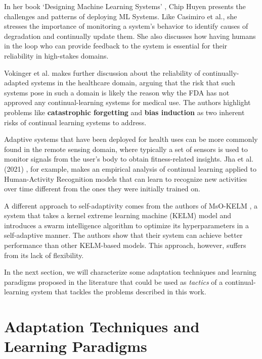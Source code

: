 \documentclass[../main.tex]{subfiles}
\begin{document}
    In her book `Designing Machine Learning Systems' \cite{huyen_designing_2022}, Chip Huyen presents the challenges and patterns of deploying ML Systems. Like Casimiro et al., she stresses the importance of monitoring a system's behavior to identify causes of degradation and continually update them. She also discusses how having humans in the loop who can provide feedback to the system is essential for their reliability in high-stakes domains.

    Vokinger et al. \cite{vokingerContinualLearningMedical2021} makes further discussion about the reliability of continually-adapted systems in the healthcare domain, arguing that the risk that such systems pose in such a domain is likely the reason why the FDA has not approved any continual-learning systems for medical use. The authors highlight problems like \textbf{catastrophic forgetting} and \textbf{bias induction} as two inherent risks of continual learning systems to address.

    Adaptive systems that have been deployed for health uses can be more commonly found in the remote sensing domain, where typically a set of sensors is used to monitor signals from the user's body to obtain fitness-related insights. Jha et al. (2021) \cite{jhaContinualLearningSensorbased2021}, for example, makes an empirical analysis of continual learning applied to Human-Activity Recognition models that can learn to recognize new activities over time different from the ones they were initially trained on.
    
    A different approach to self-adaptivity comes from the authors of MsO-KELM \cite{haoTechnologyOrientedPathwayAuxiliary2022}, a system that takes a kernel extreme learning machine (KELM) model \cite{xiaEvolvingKernelExtreme2022} and introduces a swarm intelligence algorithm to optimize its hyperparameters in a self-adaptive manner. The authors show that their system can achieve better performance than other KELM-based models. This approach, however, suffers from its lack of flexibility.

    In the next section, we will characterize some adaptation techniques and learning paradigms proposed in the literature that could be used as \textit{tactics} of a continual-learning system that tackles the problems described in this work.
    
    
    \section{Adaptation Techniques and Learning Paradigms} \label{sec:relevant_techniques} 
\end{document}
